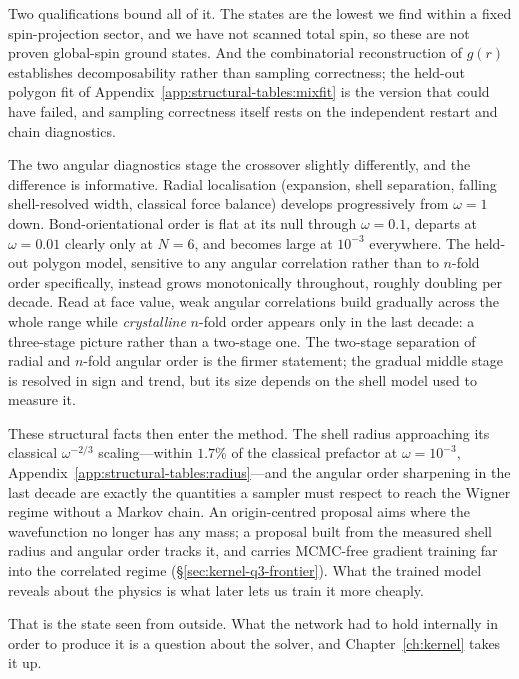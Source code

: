 Two qualifications bound all of it. The states are the lowest we find within a fixed
spin-projection sector, and we have not scanned total spin, so these are not proven
global-spin ground states. And the combinatorial reconstruction of $g(r)$ establishes
decomposability rather than sampling correctness; the held-out polygon fit of
Appendix~\ref{app:structural-tables:mixfit} is the version that could have failed, and
sampling correctness itself rests on the independent restart and chain diagnostics.

The two angular diagnostics stage the crossover slightly differently, and the difference is
informative. Radial localisation (expansion, shell separation, falling shell-resolved width, classical force balance) develops progressively from $\omega=1$ down.
Bond-orientational order is flat at its null through $\omega=0.1$, departs at $\omega=0.01$
clearly only at $N{=}6$, and becomes large at $10^{-3}$ everywhere. The held-out
polygon model, sensitive to any angular correlation rather than to $n$-fold order
specifically, instead grows monotonically throughout, roughly doubling per decade. Read at
face value, weak angular correlations build gradually across the whole range while
\emph{crystalline} $n$-fold order appears only in the last decade: a three-stage picture
rather than a two-stage one. The two-stage separation of radial and $n$-fold angular order
is the firmer statement; the gradual middle stage is resolved in sign and trend, but its size
depends on the shell model used to measure it.

These structural facts then enter the method. The shell radius approaching its classical
$\omega^{-2/3}$ scaling---within $1.7\%$ of the classical prefactor at $\omega=10^{-3}$,
Appendix~\ref{app:structural-tables:radius}---and the angular order sharpening in the last
decade are exactly the quantities a sampler must respect to reach the Wigner regime without a
Markov chain. An origin-centred proposal aims where the wavefunction no longer has any mass;
a proposal built from the measured shell radius and angular order tracks it, and carries
MCMC-free gradient training far into the correlated regime
(\S\ref{sec:kernel-q3-frontier}). What the trained model reveals about the physics is what
later lets us train it more cheaply.

That is the state seen from outside. What the network had to hold internally in order to
produce it is a question about the solver, and Chapter~\ref{ch:kernel} takes it up.
